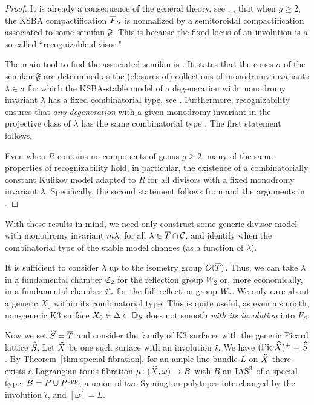\documentclass{amsart}
\begin{document}
\begin{proof}
It is already a consequence of the general theory, see
\cite[Thm.~1]{alexeev2021compact}, \cite[Thm.~3.24]{alexeev2021nonsymplectic},
that when $g\ge 2$, the KSBA compactification ${\overline F}_S$ 
is normalized by a semitoroidal compactification 
associated to some semifan $\mathfrak{F}$. This is because the
fixed locus of an involution is a so-called ``recognizable divisor." 

The main tool
to find the associated semifan is \cite[Thm.~9.3]{alexeev2021compact}.
It states that the cones $\sigma$ of the semifan $\mathfrak{F}$ 
are determined as the (closures of) collections of monodromy
invariants $\lambda\in \sigma$ for which the KSBA-stable model
of a degeneration with monodromy invariant $\lambda$
has a fixed combinatorial type, see \cite[Def.~8.12]{alexeev2021compact}.
Furthermore, recognizability ensures
that {\it any degeneration} with a given monodromy invariant in the projective
class of $\lambda$ has the same combinatorial type \cite[Cor.~8.13]{alexeev2021compact}.
The first statement follows.

Even when $R$ contains no components of genus $g\ge 2$, many of the same
properties of recognizability hold, in particular, the existence of a combinatorially
constant Kulikov model adapted to $R$ for all divisors with a fixed monodromy
invariant $\lambda$. Specifically, the second statement
follows from \cite[Prop.~8.16]{alexeev2021compact}
and the arguments in \cite[Thm.~3.24]{alexeev2021nonsymplectic}.
\end{proof}


With these results in mind, we need only construct some generic divisor model
with monodromy invariant $m\lambda$, for all $\lambda\in {\overline T}\cap {\mathcal C}$,
and identify when the combinatorial type of the stable model
changes (as a function of $\lambda$). 

It is sufficient to consider
$\lambda$ up to the isometry group $O({\overline T})$. Thus, we can take
$\lambda$ in a fundamental chamber ${\mathfrak C}_2$ for the reflection group
$W_2$ or, more economically, in a fundamental chamber ${\mathfrak C}_{\rm r}$
for the full reflection group $W_{\rm r}$.
We only care about a generic $X_0$ within its combinatorial type.
This is quite useful, as even a smooth, non-generic 
K3 surface $X_0\in \Delta\subset {\mathbb D}_S$ 
does not smooth {\it with its involution} into $F_S$.

\medskip

Now we set ${\widehat S}={\overline T}$ and consider the family of K3 surfaces with the
generic Picard lattice ${\widehat S}$. Let ${\widehat X}$ be one
such surface with an involution $\hat \iota$. We have $(\operatorname{Pic} {\widehat X})^+={\widehat S}$. 
By Theorem~\ref{thm:special-fibration}, for an ample line bundle $L$ on
${\widehat X}$ there exists a Lagrangian torus fibration
$\mu\colon({\widehat X},\omega)\to B$ with $B$ an $\operatorname{IAS}^2$ of a special type:
$B=P\cup P^{\rm opp}$, a union of two Symington polytopes interchanged by
the involution $\hat{\iota}$, and $[\omega]=L$. 
\end{document}
